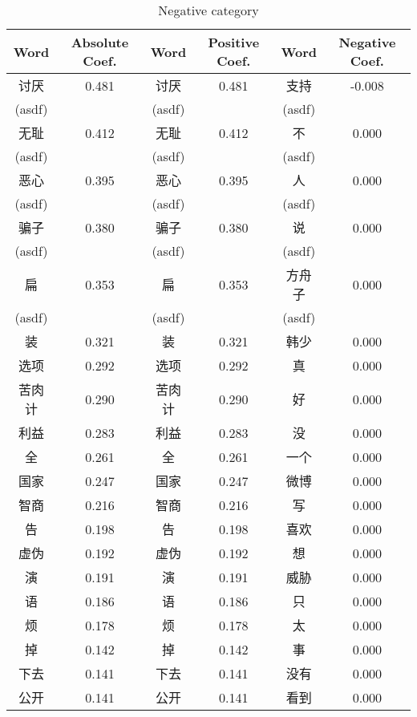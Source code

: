\documentclass[11pt]{article}
\newcommand{\1}[1]{{\mathbf 1}\left\{#1\right\}}        %
\begin{document}
\begin{table}
\caption{Negative category}
\begin{center}
\begin{tabular}{|c|c||c|c||c|c|}
\hline
Word & Absolute Coef. & Word & Positive Coef. & Word & Negative Coef.\\ \hline \hline
讨厌 & 0.481 & 讨厌 & 0.481 & 支持 & -0.008\\
(asdf) & & (asdf) & & (asdf) & \\\hline
无耻 & 0.412 & 无耻 & 0.412 & 不 & 0.000\\
(asdf) & & (asdf) & & (asdf) & \\\hline
恶心 & 0.395 & 恶心 & 0.395 & 人 & 0.000\\
(asdf) & & (asdf) & & (asdf) & \\\hline
骗子 & 0.380 & 骗子 & 0.380 & 说 & 0.000\\
(asdf) & & (asdf) & & (asdf) & \\\hline
扁 & 0.353 & 扁 & 0.353 & 方舟子 & 0.000\\
(asdf) & & (asdf) & & (asdf) & \\\hline
装 & 0.321 & 装 & 0.321 & 韩少 & 0.000\\ \hline
选项 & 0.292 & 选项 & 0.292 & 真 & 0.000\\ \hline
苦肉计 & 0.290 & 苦肉计 & 0.290 & 好 & 0.000\\ \hline
利益 & 0.283 & 利益 & 0.283 & 没 & 0.000\\ \hline
全 & 0.261 & 全 & 0.261 & 一个 & 0.000\\ \hline
国家 & 0.247 & 国家 & 0.247 & 微博 & 0.000\\ \hline
智商 & 0.216 & 智商 & 0.216 & 写 & 0.000\\ \hline
告 & 0.198 & 告 & 0.198 & 喜欢 & 0.000\\ \hline
虚伪 & 0.192 & 虚伪 & 0.192 & 想 & 0.000\\ \hline
演 & 0.191 & 演 & 0.191 & 威胁 & 0.000\\ \hline
语 & 0.186 & 语 & 0.186 & 只 & 0.000\\ \hline
烦 & 0.178 & 烦 & 0.178 & 太 & 0.000\\ \hline
掉 & 0.142 & 掉 & 0.142 & 事 & 0.000\\ \hline
下去 & 0.141 & 下去 & 0.141 & 没有 & 0.000\\ \hline
公开 & 0.141 & 公开 & 0.141 & 看到 & 0.000\\ \hline
\end{tabular}
\end{center}
\end{table}
\end{document}
